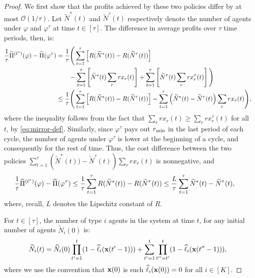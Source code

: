 \documentclass[12pt]{article}
\begin{document}
\begin{proof}
We first show that the profits achieved by these two policies differ by at most $\mathcal{O}(1/\tau)$. Let $\widetilde{N}^*(t)$ and $\widetilde{N}^\tau(t)$ respectively denote the  number of agents under $\varphi$ and $\varphi^\tau$ at time $t \in [\tau]$. The difference in average profits over $\tau$ time periods, then, is:
\begin{align*}
  \frac1\tau \widetilde{\Pi}^{(l^*)}(\varphi)-\widetilde{\Pi}({\varphi}^\tau) &= \frac1\tau \Bigg(\sum_{t=1}^{\tau} \left[R(\widetilde{N}^*(t)) - R(\widetilde{N}^{\tau}(t))\right] \\&\qquad -
   \sum_{t=1}^{\tau}\left[\widetilde{N}^*(t) \sum_r rx_r (t)\right] + \sum_{t=1}^{\tau}\left[\widetilde{N}^\tau(t) \sum_r rx_r^\tau(t)\right] \Bigg) \\
   &\leq \frac1\tau \Bigg(\sum_{t=1}^{\tau} \left[R(\widetilde{N}^*(t)) - R(\widetilde{N}^{\tau}(t))\right] -
   \sum_{t=1}^{\tau}\left(\widetilde{N}^*(t)-\widetilde{N}^\tau(t)\right) \sum_r rx_r (t)\Bigg),
\end{align*}
where the inequality follows from the fact that $\sum_r r x_r(t) \geq \sum_r r x_r^\tau(t)$ for all $t$, by \eqref{eq:mirror-def}. Similarly, since ${\varphi}^\tau$ pays out $r_{\min}$ in the last period of each cycle, the  number of agents under $\varphi^\tau$ is lower at the beginning of a cycle, and consequently for the rest of time. Thus, the cost difference between the two policies $\sum_{t=1}^{\tau}\left(\widetilde{N}^*(t)) - \widetilde{N}^{\tau}(t)\right)\sum_r rx_r(t)$ is nonnegative, and
\begin{align}\label{eq:diff-2}
    \frac1\tau\widetilde{\Pi}^{(l^*)}(\varphi)-\widetilde{\Pi}({\varphi}^\tau) &\leq \frac1\tau \sum_{t=1}^{\tau} R(\widetilde{N}^*(t)) - R(\widetilde{N}^{\tau}(t)) 
    \leq \frac{L}{\tau}\sum_{t=1}^{\tau} \widetilde{N}^*(t) - \widetilde{N}^{\tau}(t),
\end{align}
{where, recall, $L$ denotes the Lipschitz constant of $R$}. 


For $t \in [\tau]$, the  number of type $i$ agents in the system at time $t$, for any initial number of agents $\widetilde{N}_i(0)$ is:
\begin{align}\label{eq:key-decomposition}
  \widetilde{N}_i(t) = \widetilde{N}_i(0) \prod_{t'=1}^t (1-\widehat{\ell}_i(\mathbf{x}(t'-1))) + \sum_{t'=1}^t \prod_{t''=t'}^t (1-\widehat{\ell}_i(\mathbf{x}(t''-1))),
\end{align}
where we use the convention that $\mathbf{x}(0)$ is such $\widehat{\ell}_i(\mathbf{x}(0)) = 0$ for all $i \in [K]$.


\end{proof}
\end{document}

